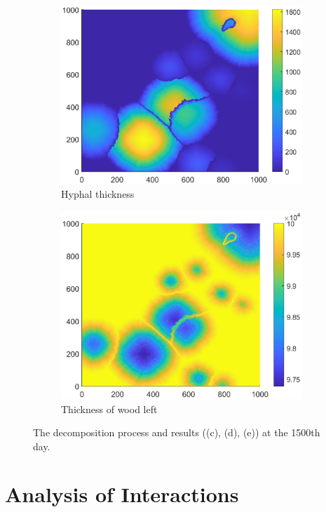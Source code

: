 \documentclass[a4paper,12pt]{article}
\begin{document}
\begin{figure}[H]
\begin{subfigure}{0.3\textwidth}
		\includegraphics[width=\textwidth]{./picture/g_houduE.eps}
		\caption{Hyphal thickness}
		\label{Eg_thick}
	\end{subfigure}
	\begin{subfigure}{0.3\textwidth}
		\includegraphics[width=\textwidth]{./picture/Eg_muban.eps}
		\caption{Thickness of wood left}
		\label{Eg_wood}
	\end{subfigure}
	\caption{The decomposition process and results ((c), (d), (e)) at the 1500th day.}
\end{figure}




\section{Analysis of Interactions}
\end{document}
